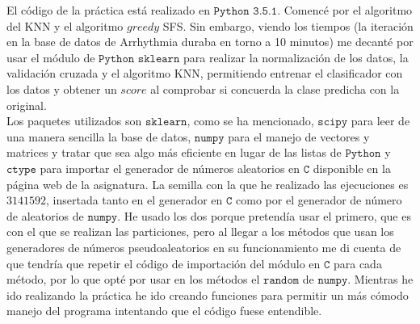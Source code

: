 \documentclass[11pt,leqno]{article}
\begin{document}
El código de la práctica está realizado en $\texttt{Python 3.5.1}$. Comencé por el algoritmo del KNN y el algoritmo $\textit{greedy}$ SFS. Sin embargo, viendo los tiempos (la iteración en la base de datos de Arrhythmia duraba en torno a 10 minutos) me decanté por usar el módulo de $\texttt{Python}$ $\texttt{sklearn}$ para realizar la normalización de los datos, la validación cruzada y el algoritmo KNN, permitiendo entrenar el clasificador con los datos y obtener un $\textit{score}$ al comprobar si concuerda la clase predicha con la original.\\

Los paquetes utilizados son $\texttt{sklearn}$, como se ha mencionado, $\texttt{scipy}$ para leer de una manera sencilla la base de datos, $\texttt{numpy}$ para el manejo de vectores y matrices y tratar que sea algo más eficiente en lugar de las listas de $\texttt{Python}$ y $\texttt{ctype}$ para importar el generador de números aleatorios en $\texttt{C}$ disponible en la página web de la asignatura. La semilla con la que he realizado las ejecuciones es $3141592$, insertada tanto en el generador en $\texttt{C}$ como por el generador de número de aleatorios de $\texttt{numpy}$. He usado los dos porque pretendía usar el primero, que es con el que se realizan las particiones, pero al llegar a los métodos que usan los generadores de números pseudoaleatorios en su funcionamiento me di cuenta de que tendría que repetir el código de importación del módulo en $\texttt{C}$ para cada método, por lo que opté por usar en los métodos el $\texttt{random}$ de $\texttt{numpy}$. Mientras he ido realizando la práctica he ido creando funciones para permitir un más cómodo manejo del programa intentando que el código fuese entendible.
\end{document}
